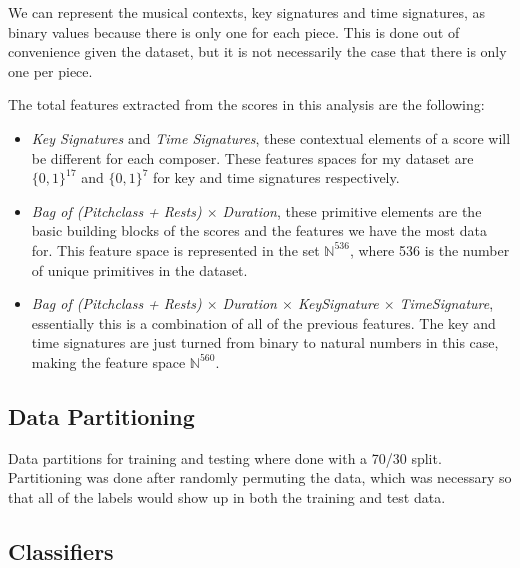 \documentclass[10pt]{IEEEtran}
\begin{document}
We can represent the musical contexts, key signatures and time signatures, as
binary values because there is only one for each piece. This is done out of
convenience given the dataset, but it is not necessarily the case that there is
only one per piece.

The total features extracted from the scores in this analysis are the following:
\begin{itemize}
\item {\it Key Signatures} and {\it Time Signatures}, these contextual elements
  of a score will be different for each composer. These features spaces for my
  dataset are $\{0,1\}^{17}$ and $\{0,1\}^7$ for key and time signatures
  respectively.

\item {\it Bag of (Pitchclass + Rests) $\times$ Duration}, these primitive
  elements are the basic building blocks of the scores and the features we have
  the most data for. This feature space is represented in the set
  $\mathbb{N}^{536}$, where 536 is the number of unique primitives in the
  dataset.

\item {\it Bag of (Pitchclass + Rests) $\times$ Duration $\times$ KeySignature
  $\times$ TimeSignature}, essentially this is a combination of all of the
  previous features. The key and time signatures are just turned from binary
  to natural numbers in this case, making the feature space $\mathbb{N}^{560}$.
\end{itemize}

\subsection{Data Partitioning}

Data partitions for training and testing where done with a 70/30 split.
Partitioning was done after randomly permuting the data, which was necessary so
that all of the labels would show up in both the training and test data.

\subsection{Classifiers}
\end{document}
